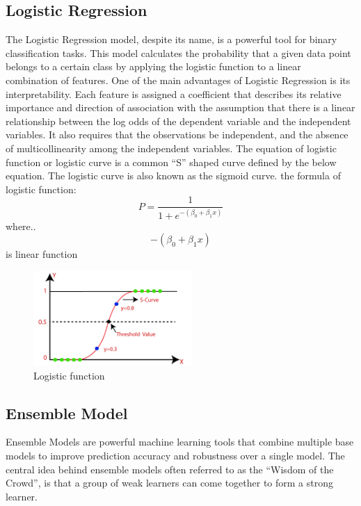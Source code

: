 \documentclass[12pt]{report}
\begin{document}
\subsection*{Logistic Regression}
The Logistic Regression model, despite its name, is a powerful tool for binary
classification tasks. This model calculates the probability that a given data
point belongs to a certain class by applying the logistic function to a linear
combination of features\cite{hosmer2013applied}. One of the main advantages of
Logistic Regression is its interpretability. Each feature is assigned a
coefficient that describes its relative importance and direction of association
with the assumption that there is a linear relationship between the log odds of
the dependent variable and the independent variables. It also requires that the
observations be independent, and the absence of multicollinearity among the
independent variables\cite{peng2002introduction}. The equation of logistic
function or logistic curve is a common “S” shaped curve defined by the below
equation. The logistic curve is also known as the sigmoid
curve\cite{sharma2022logistic}. the formula of logistic function: \[ P=\frac{1}{1+e^{-\left(\beta_0+\beta_1 x\right)}} \]
where..\\$$ {-\left(\beta_0+\beta_1 x\right)} $$ is linear function

\begin{figure}[ht]
      \centering
      \includegraphics[width=6cm]{./figures/logistic-regression-in-machine-learning.png}
      \caption{Logistic function}\label{fig:fig3}
\end{figure}

\newpage
\subsection*{Ensemble Model}
Ensemble Models are powerful machine learning tools that combine multiple base
models to improve prediction accuracy and robustness over a single model. The
central idea behind ensemble models often referred to as the ``Wisdom of the
Crowd'', is that a group of weak learners can come together to form a strong
learner\cite{dietterich2000ensemble}.\newline
\end{document}
